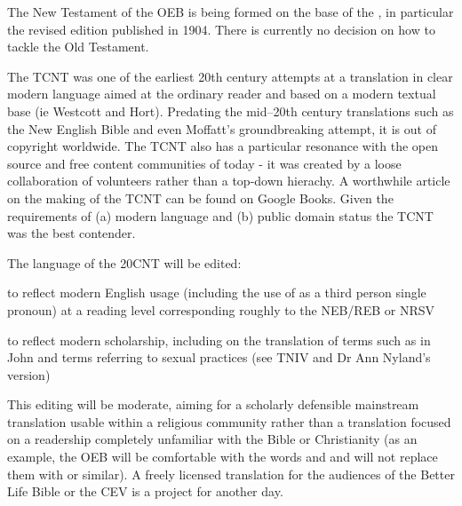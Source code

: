 
The New Testament of the OEB is being formed on the base of the
, in particular the
revised edition published in 1904. There is currently no decision
on how to tackle the Old Testament.


The TCNT was one of the earliest 20th century attempts at a
translation in clear modern language aimed at the ordinary reader
and based on a modern textual base (ie Westcott and Hort).
Predating the mid--20th century translations such as the New
English Bible and even Moffatt's groundbreaking attempt, it is out
of copyright worldwide. The TCNT also has a particular resonance
with the open source and free content communities of today - it was
created by a loose collaboration of volunteers rather than a
top-down hierachy. A worthwhile article on the making of the TCNT
can be found on Google Books. Given the requirements of (a) modern
language and (b) public domain status the TCNT was the best
contender.


The language of the 20CNT will be edited:

\startitemize
\item
  to reflect modern English usage (including the use of 
  as a third person single pronoun) at a reading level corresponding
  roughly to the NEB/REB or NRSV
\item
  to reflect modern scholarship, including on the translation of
  terms such as  in John and terms referring to
  sexual practices (see TNIV and Dr Ann Nyland's version)
\stopitemize

This editing will be moderate, aiming for a scholarly defensible
mainstream translation usable within a religious community rather
than a translation focused on a readership completely unfamiliar
with the Bible or Christianity (as an example, the OEB will be
comfortable with the words  and  and
will not replace them with  or similar). A
freely licensed translation for the audiences of the Better Life
Bible or the CEV is a project for another day.



